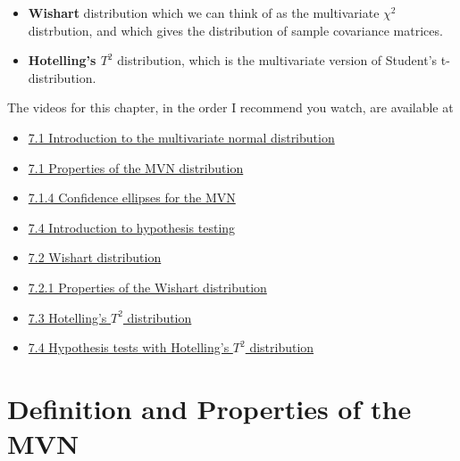 \documentclass[
]{book}
\providecommand{\tightlist}{%
  \setlength{\itemsep}{0pt}\setlength{\parskip}{0pt}}
\theoremstyle{definition}
\theoremstyle{definition}
\theoremstyle{definition}
\theoremstyle{definition}
\theoremstyle{remark}
\begin{document}
\begin{itemize}
\item
  \textbf{Wishart} distribution which we can think of as the multivariate \(\chi^2\) distrbution, and which gives the distribution of sample covariance matrices.
\item
  \textbf{Hotelling's \(T^2\)} distribution, which is the multivariate version of Student's t-distribution.
\end{itemize}

The videos for this chapter, in the order I recommend you watch, are available at

\begin{itemize}
\tightlist
\item
  \href{https://mediaspace.nottingham.ac.uk/media/Multivariate+Normal+Random+VariablesA+Introduction/1_pdjxphay}{7.1 Introduction to the multivariate normal distribution}
\item
  \href{https://mediaspace.nottingham.ac.uk/media/Multivariate+Normal+Random+VariablesA++Properties/1_j9mh4v7r}{7.1 Properties of the MVN distribution}
\item
  \href{https://mediaspace.nottingham.ac.uk/media/Multivariate+Normal+Random+VariablesA++Confidence+Ellipses/1_dlvgqoi3}{7.1.4 Confidence ellipses for the MVN}
\item
  \href{https://mediaspace.nottingham.ac.uk/media/MVN_HypothesistestIntro.mp4/1_b1gstf1h}{7.4 Introduction to hypothesis testing}
\item
  \href{https://mediaspace.nottingham.ac.uk/media/MVN_Wishart/1_3kpedgb6}{7.2 Wishart distribution}
\item
  \href{https://mediaspace.nottingham.ac.uk/media/MVN_WishartProperties/1_yfgzcsyb}{7.2.1 Properties of the Wishart distribution}
\item
  \href{https://mediaspace.nottingham.ac.uk/media/MVN_Hotelling.mp4/1_5evjeyu8}{7.3 Hotelling's \(T^2\) distribution}
\item
  \href{https://mediaspace.nottingham.ac.uk/media/Multivariate+NormalsA+Hypothesis+testing/1_bhk20k5z}{7.4 Hypothesis tests with Hotelling's \(T^2\) distribution}
\end{itemize}

\hypertarget{definition-and-properties-of-the-mvn}{%
\section{Definition and Properties of the MVN}\label{definition-and-properties-of-the-mvn}}
\end{document}
